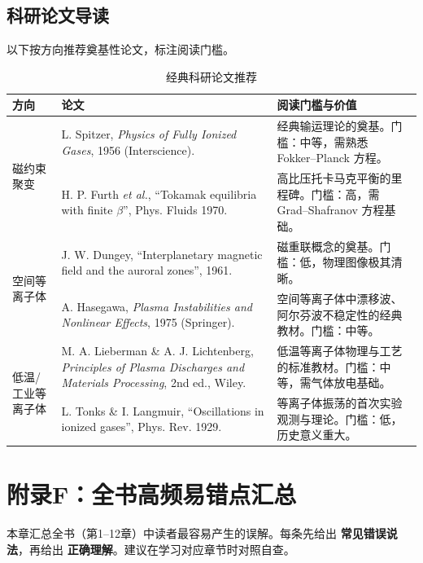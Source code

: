 \section{科研论文导读}

以下按方向推荐奠基性论文，标注阅读门槛。

\begin{table}[htbp]
\centering
\caption{经典科研论文推荐}
\label{tab:papers}
\small
\begin{tabular}{@{}p{2.5cm}p{5.5cm}p{5.5cm}@{}}
\toprule
\textbf{方向} & \textbf{论文} & \textbf{阅读门槛与价值} \\
\midrule
\multirow{2}{2.5cm}{磁约束聚变} & L. Spitzer, \textit{Physics of Fully Ionized Gases}, 1956 (Interscience). & 经典输运理论的奠基。门槛：中等，需熟悉 Fokker--Planck 方程。 \\
 & H. P. Furth \textit{et al.}, ``Tokamak equilibria with finite $\beta$'', Phys. Fluids 1970. & 高比压托卡马克平衡的里程碑。门槛：高，需 Grad--Shafranov 方程基础。 \\
\midrule
\multirow{2}{2.5cm}{空间等离子体} & J. W. Dungey, ``Interplanetary magnetic field and the auroral zones'', 1961. & 磁重联概念的奠基。门槛：低，物理图像极其清晰。 \\
 & A. Hasegawa, \textit{Plasma Instabilities and Nonlinear Effects}, 1975 (Springer). & 空间等离子体中漂移波、阿尔芬波不稳定性的经典教材。门槛：中等。 \\
\midrule
\multirow{2}{2.5cm}{低温/工业等离子体} & M. A. Lieberman \& A. J. Lichtenberg, \textit{Principles of Plasma Discharges and Materials Processing}, 2nd ed., Wiley. & 低温等离子体物理与工艺的标准教材。门槛：中等，需气体放电基础。 \\
 & L. Tonks \& I. Langmuir, ``Oscillations in ionized gases'', Phys. Rev. 1929. & 等离子体振荡的首次实验观测与理论。门槛：低，历史意义重大。 \\
\bottomrule
\end{tabular}
\end{table}


\chapter*{附录F：全书高频易错点汇总}

本章汇总全书（第1--12章）中读者最容易产生的误解。每条先给出 \textbf{常见错误说法}，再给出 \textbf{正确理解}。建议在学习对应章节时对照自查。


